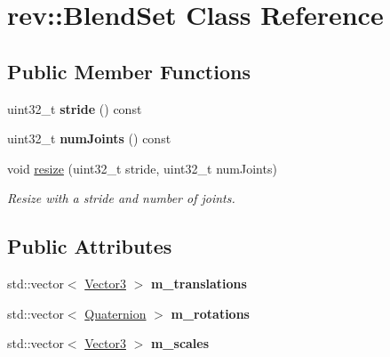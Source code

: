 \hypertarget{structrev_1_1_blend_set}{}\section{rev\+::Blend\+Set Class Reference}
\label{structrev_1_1_blend_set}
\subsection*{Public Member Functions}
\begin{DoxyCompactItemize}
\item 
\mbox{\label{structrev_1_1_blend_set_a2d0f5142c760c7a9c104e83e185fc7e3}} 
uint32\+\_\+t {\bfseries stride} () const
\item 
\mbox{\label{structrev_1_1_blend_set_af1dddef2035418f11d28857cf7eef826}} 
uint32\+\_\+t {\bfseries num\+Joints} () const
\item 
\mbox{\label{structrev_1_1_blend_set_a0c2a9a502c911687913f5762f9379681}} 
void \mbox{\hyperlink{structrev_1_1_blend_set_a0c2a9a502c911687913f5762f9379681}{resize}} (uint32\+\_\+t stride, uint32\+\_\+t num\+Joints)
\begin{DoxyCompactList}\small\item\em Resize with a stride and number of joints. \end{DoxyCompactList}\end{DoxyCompactItemize}
\subsection*{Public Attributes}
\begin{DoxyCompactItemize}
\item 
\mbox{\label{structrev_1_1_blend_set_aeb665cc57e7c5bc114ec74cfb3369ed6}} 
std\+::vector$<$ \mbox{\hyperlink{classrev_1_1_vector}{Vector3}} $>$ {\bfseries m\+\_\+translations}
\item 
\mbox{\label{structrev_1_1_blend_set_ab5f4563896cacba9ad9512c4bd0130ee}} 
std\+::vector$<$ \mbox{\hyperlink{classrev_1_1_quaternion}{Quaternion}} $>$ {\bfseries m\+\_\+rotations}
\item 
\mbox{\label{structrev_1_1_blend_set_ab70da9a6e123f56f15b3a96b8813c239}} 
std\+::vector$<$ \mbox{\hyperlink{classrev_1_1_vector}{Vector3}} $>$ {\bfseries m\+\_\+scales}
\end{DoxyCompactItemize}



